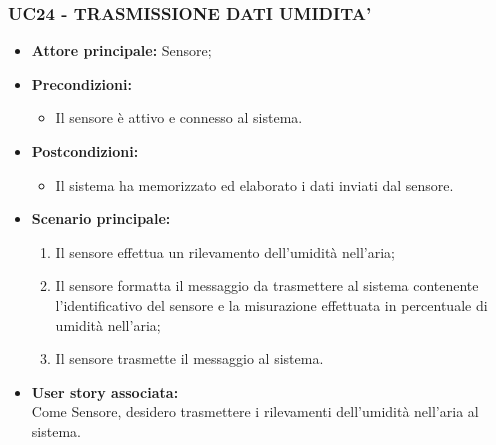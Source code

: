 \subsubsection{UC24 - TRASMISSIONE DATI UMIDITA'}
\begin{itemize}
    \item \textbf{Attore principale:} Sensore;
    \item \textbf{Precondizioni:}
        \begin{itemize}
            \item Il sensore è attivo e connesso al sistema. 
        \end{itemize}
    \item \textbf{Postcondizioni:}
        \begin{itemize}
            \item Il sistema ha memorizzato ed elaborato i dati inviati dal sensore.
        \end{itemize}
    \item \textbf{Scenario principale:}
        \begin{enumerate}
            \item Il sensore effettua un rilevamento dell'umidità nell'aria;
            \item Il sensore formatta il messaggio da trasmettere al sistema contenente l'identificativo del sensore e la misurazione effettuata in percentuale di umidità nell’aria;
            \item Il sensore trasmette il messaggio al sistema.
        \end{enumerate}
    \item \textbf{User story associata:} \\
    Come Sensore, desidero trasmettere i rilevamenti dell'umidità nell'aria al sistema.
\end{itemize}
